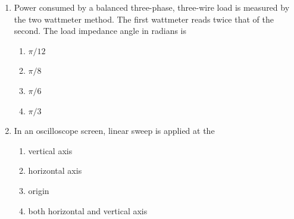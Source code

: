 \documentclass[journal,12pt,onecolumn]{IEEEtran}
\begin{document}
\begin{enumerate}[label=Q\arabic*:, leftmargin=*, itemindent=0pt, start=16]
\item Power consumed by a balanced three-phase, three-wire load is measured by the two wattmeter method. The first wattmeter reads twice that of the second. The load impedance angle in radians is
\begin{enumerate}[label=(\Alph*)]
    \item $\pi/12$
    \item $\pi/8$
    \item $\pi/6$
    \item $\pi/3$
\end{enumerate}

\item In an oscilloscope screen, linear sweep is applied at the
\begin{enumerate}[label=(\Alph*)]
    \item vertical axis
    \item horizontal axis
    \item origin
    \item both horizontal and vertical axis
\end{enumerate}

\end{enumerate}
\end{document}
